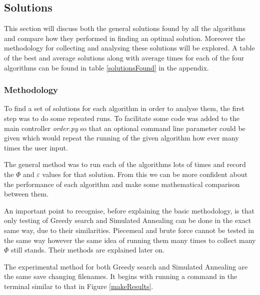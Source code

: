 \documentclass[12pt]{report}
\begin{document}
\subsection{Solutions}\label{solutions}
This section will discuss both the general solutions found by all the algorithms and compare how they performed in finding an optimal solution. Moreover the methodology for collecting and analysing these solutions will be explored. A table of the best and average solutions along with average times for each of the four algorithms can be found in table \ref{solutionsFound} in the appendix. 

\subsubsection{Methodology}
To find a set of solutions for each algorithm in order to analyse them, the first step was to do some repeated runs. To facilitate some code was added to the main controller \textit{order.py} so that an optional command line parameter could be given which would repeat the running of the given algorithm how ever many times the user input. 

The general method was to run each of the algorithms lots of times and record the $\Phi$ and $\varepsilon$ values for that solution. From this we can be more confident about the performance of each algorithm and make some mathematical comparison between them.

An important point to recognise, before explaining the basic methodology, is that only testing of Greedy search and Simulated Annealing can be done in the exact same way, due to their similarities. Piecemeal and brute force cannot be tested in the same way however the same idea of running them many times to collect many $\Phi$ still stands. Their methods are explained later on.

The experimental method for both Greedy search and Simulated Annealing are the same save changing filenames. It begins with running a command in the terminal similar to that in Figure \ref{makeResults}.
\end{document}
